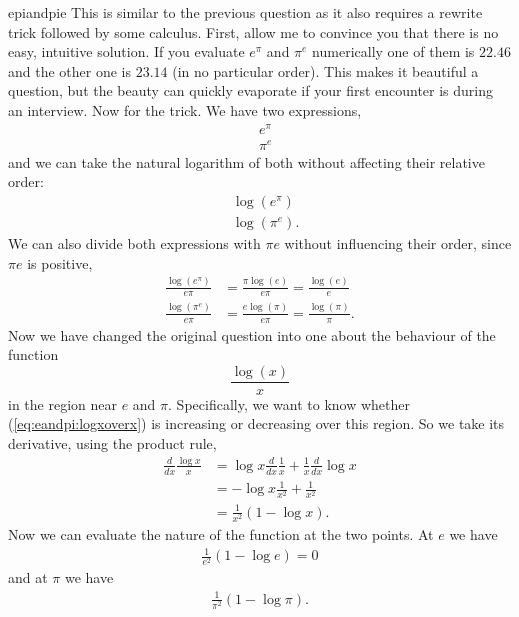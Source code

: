 \begin{answer}{epiandpie}
This is similar to the previous question as it also requires a rewrite trick followed by some calculus.
First, allow me to convince you that there is no easy, intuitive solution.
If you evaluate
$e^\pi$
and
$\pi^e$
numerically one of them is
$22.46$
and the other one is
$23.14$
(in no particular order).
This makes it beautiful a question, but the beauty can quickly evaporate if your first encounter is during an interview.
Now for the trick.
We have two expressions,
\begin{align*}
&
e^\pi
\\
&
\pi^e
\end{align*}
and we can take the natural logarithm of both without affecting their relative order:
\begin{align*}
&
\log(e^\pi)
\\
&
\log(\pi^e)
\text{.}
\end{align*}
We can also divide both expressions with $\pi e$ without influencing their order, since $\pi e$ is positive,
\begin{align*}
\frac{\log(e^\pi)}{e \pi}
&=
\frac{\pi\log(e)}{e \pi}
=
\frac{\log(e)}{e}
\\
\frac{\log(\pi^e)}{e \pi}
&=
\frac{e \log(\pi)}{e \pi}
=
\frac{\log(\pi)}{\pi}
\text{.}
\end{align*}
Now we have changed the original question into one about the behaviour of the function
\begin{equation}
\label{eq:eandpi:logxoverx}
\frac{\log(x)}{x}
\end{equation}
in the region near $e$ and $\pi$.
Specifically, we want to know whether (\ref{eq:eandpi:logxoverx}) is increasing or decreasing over this region.
So we take its derivative, using the product rule,
\begin{align*}
\frac{d}{dx}
\frac{\log{x}}{x}
 &=
\log x
\frac{d}{dx}
\frac{1}{x}
+
\frac{1}{x}
\frac{d}{dx}
\log{x}
\\
 &=
 -
\log x
\frac{1}{x^2}
+
\frac{1}{x^2}
\\
 &=
\frac{1}{x^2}
\left(
1 - \log x
\right)
\text{.}
\end{align*}
Now we can evaluate the nature of the function at the two points.
At $e$ we have
\begin{align*}
\frac{1}{e^2}
\left(
1 - \log e
\right)
=0
\end{align*}
and at $\pi$ we have
\begin{align*}
\frac{1}{\pi^2}
\left(
1 - \log \pi
\right)
\text{.}
\end{align*}

\end{answer}
